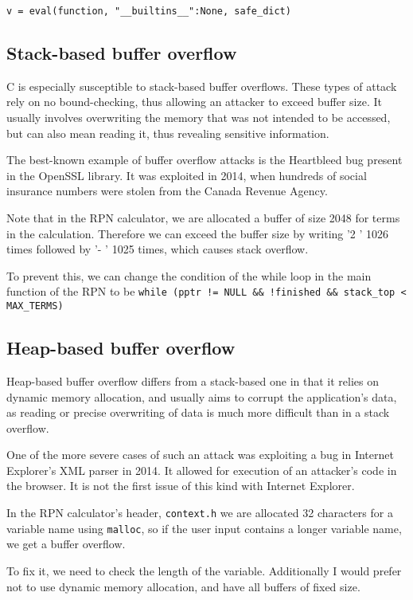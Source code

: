 \documentclass[11pt,journal]{article}
\begin{document}
	\texttt{v = eval(function, "\_\_builtins\_\_":None, safe\_dict)}
	
	\subsection{Stack-based buffer overflow}
	C is especially susceptible to stack-based buffer overflows. These types of attack rely on no bound-checking, thus allowing an attacker to exceed buffer size. It usually involves overwriting the memory that was not intended to be accessed, but can also mean reading it, thus revealing sensitive information.
	
	The best-known example of buffer overflow attacks is the Heartbleed bug present in the OpenSSL library. It was exploited in 2014, when hundreds of social insurance numbers were stolen from the Canada Revenue Agency\cite{heartbleed news}.
	
	Note that in the RPN calculator, we are allocated a buffer of size 2048 for terms in the calculation. Therefore we can exceed the buffer size by writing '2 ' 1026 times followed by '- ' 1025 times, which causes stack overflow.
	
	To prevent this, we can change the condition of the while loop in the main function of the RPN to be \texttt{while (pptr != NULL \&\& !finished \&\& stack\_top < MAX\_TERMS) }
	
	\subsection{Heap-based buffer overflow}
	Heap-based buffer overflow differs from a stack-based one in that it relies on dynamic memory allocation, and usually aims to corrupt the application's data, as reading or precise overwriting of data is much more difficult than in a stack overflow. 
	
	One of the more severe cases of such an attack was exploiting a bug in Internet Explorer's XML parser in 2014. It allowed for execution of an attacker's code in the browser. It is not the first issue of this kind with Internet Explorer. 
	
	In the RPN calculator's header, \texttt{context.h} we are allocated 32 characters for a variable name using \texttt{malloc}, so if the user input contains a longer variable name, we get a buffer overflow. 
	
	To fix it, we need to check the length of the variable. Additionally I would prefer not to use dynamic memory allocation, and have all buffers of fixed size.
	
\end{document}
